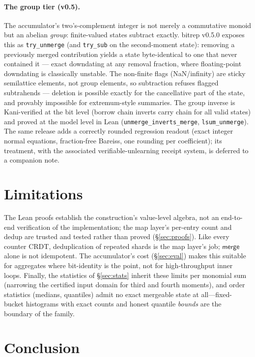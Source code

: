 \documentclass[11pt]{article}
\begin{document}
\paragraph{The group tier (v0.5).} The accumulator's two's-complement integer is
not merely a commutative monoid but an abelian \emph{group}: finite-valued
states subtract exactly. bitrep v0.5.0 exposes this as \texttt{try\_unmerge}
(and \texttt{try\_sub} on the second-moment state): removing a previously
merged contribution yields a state byte-identical to one that never contained
it --- exact downdating at any removal fraction, where floating-point
downdating is classically unstable. The non-finite flags (NaN/infinity) are
sticky semilattice elements, not group elements, so subtraction refuses
flagged subtrahends --- deletion is possible exactly for the cancellative part
of the state, and provably impossible for extremum-style summaries. The group
inverse is Kani-verified at the bit level (borrow chain inverts carry chain
for all valid states) and proved at the model level in Lean
(\texttt{unmerge\_inverts\_merge}, \texttt{lsum\_unmerge}). The same release
adds a correctly rounded regression readout (exact integer normal equations,
fraction-free Bareiss, one rounding per coefficient); its treatment, with the
associated verifiable-unlearning receipt system, is deferred to a companion
note.

\section{Limitations}

The Lean proofs establish the construction's value-level algebra, not an end-to-end verification of the
implementation; the map layer's per-entry count and dedup are trusted and tested rather than proved
(\S\ref{sec:proofs}). Like every counter CRDT, deduplication of repeated shards is the map layer's job;
$\mathsf{merge}$ alone is not idempotent. The accumulator's cost (\S\ref{sec:eval}) makes this suitable
for aggregates where bit-identity is the point, not for high-throughput inner loops. Finally, the
statistics of \S\ref{sec:stats} inherit these limits per monomial sum (narrowing the certified input
domain for third and fourth moments), and order statistics (medians, quantiles) admit no exact mergeable
state at all---fixed-bucket histograms with exact counts and honest quantile \emph{bounds} are the
boundary of the family.

\section{Conclusion}
\end{document}
